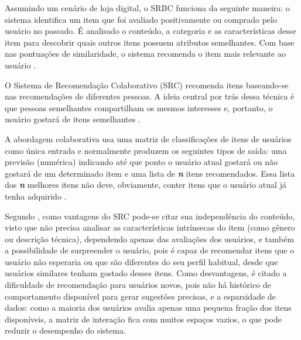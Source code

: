Assumindo um cenário de loja digital, o SRBC funciona da seguinte maneira: o sistema identifica um item que foi avaliado positivamente ou comprado pelo usuário no passado. É analisado o conteúdo, a categoria e as características desse item para descobrir quais outros itens possuem atributos semelhantes. Com base nas pontuações de similaridade, o sistema recomenda o item mais relevante ao usuário \cite{patel2023recommendation}.

O Sistema de Recomendação Colaborativo (SRC) recomenda itens baseando-se nas recomendações de diferentes pessoas. A ideia central por trás dessa técnica é que pessoas semelhantes compartilham os mesmos interesses e, portanto, o usuário gostará de itens semelhantes \cite{kumar2021recommender}.

A abordagem colaborativa usa uma matriz de classificações de itens de usuários como única entrada e normalmente produzem os seguintes tipos de saída: uma previsão (numérica) indicando até que ponto o usuário atual gostará ou não gostará de um determinado item e uma lista de \textbf{\textit{n}} itens recomendados. Essa lista dos \textbf{\textit{n}} melhores itens não deve, obviamente, conter itens que o usuário atual já tenha adquirido \cite{Jannach2011}. 

Segundo , como vantagens do SRC pode-se citar sua independência do conteúdo, visto que não precisa analisar as características intrínsecas do item (como gênero ou descrição técnica), dependendo apenas das avaliações dos usuários, e também a possibilidade de surpreender o usuário, pois é capaz de recomendar itens que o usuário não esperaria ou que são diferentes do seu perfil habitual, desde que usuários similares tenham gostado desses itens. Como desvantagens, é citado a dificuldade de recomendação para usuários novos, pois não há histórico de comportamento disponível para gerar sugestões precisas, e a esparsidade de dados: como a maioria dos usuários avalia apenas uma pequena fração dos itens disponíveis, a matriz de interação fica com muitos espaços vazios, o que pode reduzir o desempenho do sistema.

